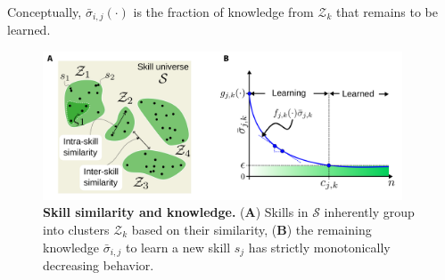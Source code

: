 \documentclass[12pt]{article}
\begin{document}
Conceptually, $\bar{\sigma}_ {i,j}\left(\cdot\right)$ is the fraction of knowledge from ${\mathcal{Z}_k}$ that remains to be learned.


\begin{figure}[!t]
	\centering
	\includegraphics[width=0.95\textwidth]{fig/skill_similarity_and_knowledge.png}
	\caption{\textbf{Skill similarity and knowledge.} (\textbf{A}) Skills in $\mathcal{S}$ inherently group into clusters $\mathcal{Z}_k$ based on their similarity, (\textbf{B}) the remaining knowledge $\bar{\sigma}_{i,j}$ to learn a new skill $s_{j}$ has strictly monotonically decreasing behavior.}
    \label{fig:skill_similarity_and_knowledge} 
\end{figure}
\end{document}
